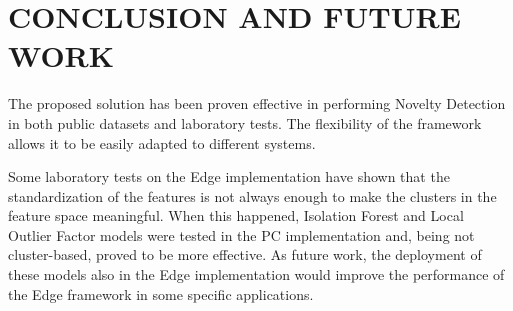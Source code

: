 \section{CONCLUSION AND FUTURE WORK}

The proposed solution has been proven effective in performing Novelty Detection in both public datasets and laboratory tests. The flexibility of the framework allows it to be easily adapted to different systems. 

Some laboratory tests on the Edge implementation have shown that the standardization of the features is not always enough to make the clusters in the feature space meaningful. When this happened, Isolation Forest and Local Outlier Factor models were tested in the PC implementation and, being not cluster-based, proved to be more effective. As future work, the deployment of these models also in the Edge implementation would improve the performance of the Edge framework in some specific applications.